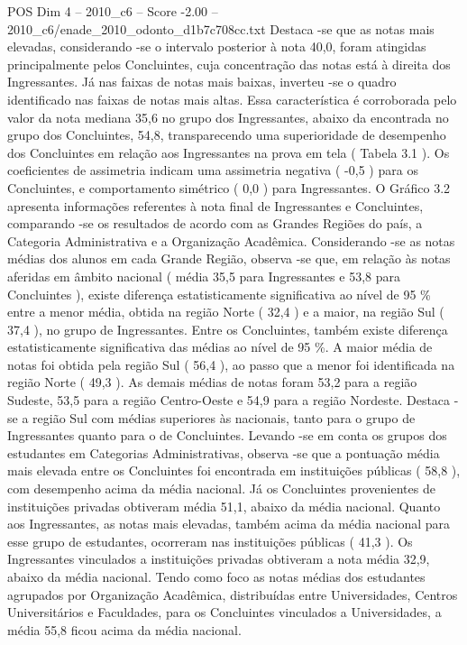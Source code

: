 \begin{textsample}{POS Dim 4 – 2010\_c6 – Score -2.00 – 2010\_c6/enade\_2010\_odonto\_d1b7c708cc.txt}
Destaca -se que as notas mais elevadas, considerando -se o intervalo posterior à nota 40,0, foram atingidas principalmente pelos Concluintes, cuja concentração das notas está à direita dos Ingressantes.
Já nas faixas de notas mais baixas, inverteu -se o quadro identificado nas faixas de notas mais altas.
Essa característica é corroborada pelo valor da nota mediana 35,6 no grupo dos Ingressantes, abaixo da encontrada no grupo dos Concluintes, 54,8, transparecendo uma superioridade de desempenho dos Concluintes em relação aos Ingressantes na prova em tela ( Tabela 3.1 ).
Os coeficientes de assimetria indicam uma assimetria negativa ( -0,5 ) para os Concluintes, e comportamento simétrico ( 0,0 ) para Ingressantes.
O Gráfico 3.2 apresenta informações referentes à nota final de Ingressantes e Concluintes, comparando -se os resultados de acordo com as Grandes Regiões do país, a Categoria Administrativa e a Organização Acadêmica.
Considerando -se as notas médias dos alunos em cada Grande Região, observa -se que, em relação às notas aferidas em âmbito nacional ( média 35,5 para Ingressantes e 53,8 para Concluintes ), existe diferença estatisticamente significativa ao nível de 95 \% entre a menor média, obtida na região Norte ( 32,4 ) e a maior, na região Sul ( 37,4 ), no grupo de Ingressantes.
Entre os Concluintes, também existe diferença estatisticamente significativa das médias ao nível de 95 \%.
A maior média de notas foi obtida pela região Sul ( 56,4 ), ao passo que a menor foi identificada na região Norte ( 49,3 ).
As demais médias de notas foram 53,2 para a região Sudeste, 53,5 para a região Centro-Oeste e 54,9 para a região Nordeste.
Destaca -se a região Sul com médias superiores às nacionais, tanto para o grupo de Ingressantes quanto para o de Concluintes.
Levando -se em conta os grupos dos estudantes em Categorias Administrativas, observa -se que a pontuação média mais elevada entre os Concluintes foi encontrada em instituições públicas ( 58,8 ), com desempenho acima da média nacional.
Já os Concluintes provenientes de instituições privadas obtiveram média 51,1, abaixo da média nacional.
Quanto aos Ingressantes, as notas mais elevadas, também acima da média nacional para esse grupo de estudantes, ocorreram nas instituições públicas ( 41,3 ).
Os Ingressantes vinculados a instituições privadas obtiveram a nota média 32,9, abaixo da média nacional.
Tendo como foco as notas médias dos estudantes agrupados por Organização Acadêmica, distribuídas entre Universidades, Centros Universitários e Faculdades, para os Concluintes vinculados a Universidades, a média 55,8 ficou acima da média nacional.

\end{textsample}
